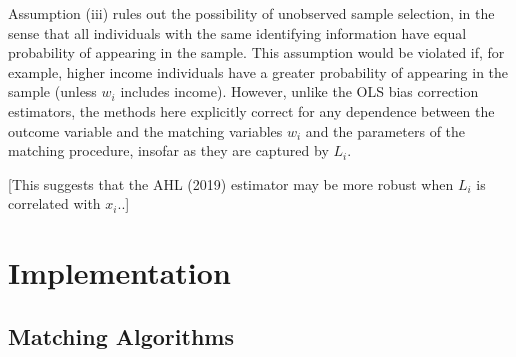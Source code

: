 \documentclass[12pt]{article}
\begin{document}
Assumption (iii) rules out the possibility of unobserved sample selection, in the sense that all individuals with the same identifying information have equal probability of appearing in the sample.  This assumption would be violated if, for example, higher income individuals have a greater probability of appearing in the sample (unless $w_i$ includes income).   However, unlike the OLS bias correction estimators, the methods here explicitly correct for any dependence between the outcome variable and the matching variables $w_i$ and the parameters of the matching procedure, insofar as they are captured by $L_i$.  

[This suggests that the AHL (2019) estimator may be more robust when $L_i$ is correlated with $x_i$..]

\section{Implementation}

\subsection{Matching Algorithms}
\end{document}
